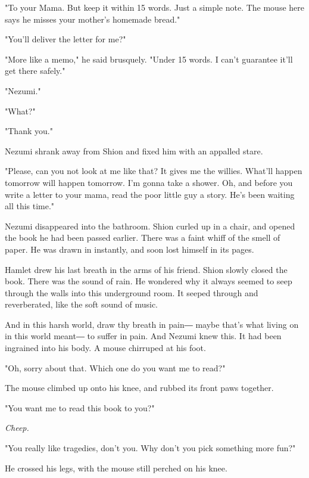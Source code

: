 "To your Mama. But keep it within 15 words. Just a simple note. The
mouse here says he misses your mother's homemade bread."

"You'll deliver the letter for me?"

"More like a memo," he said brusquely. "Under 15 words. I can't
guarantee it'll get there safely."

"Nezumi."

"What?"

"Thank you."

Nezumi shrank away from Shion and fixed him with an appalled stare.

"Please, can you not look at me like that? It gives me the willies.
What'll happen tomorrow will happen tomorrow. I'm gonna take a shower.
Oh, and before you write a letter to your mama, read the poor little guy
a story. He's been waiting all this time."

Nezumi disappeared into the bathroom. Shion curled up in a chair, and
opened the book he had been passed earlier. There was a faint whiff of
the smell of paper. He was drawn in instantly, and soon lost himself in
its pages.


Hamlet drew his last breath in the arms of his friend. Shion slowly
closed the book. There was the sound of rain. He wondered why it always
seemed to seep through the walls into this underground room. It seeped
through and reverberated, like the soft sound of music.

And in this harsh world, draw thy breath in pain― maybe that's what
living on in this world meant― to suffer in pain. And Nezumi knew this.
It had been ingrained into his body. A mouse chirruped at his foot.

"Oh, sorry about that. Which one do you want me to read?"

The mouse climbed up onto his knee, and rubbed its front paws together.

"You want me to read this book to you?"

\emph{Cheep.}

"You really like tragedies, don't you. Why don't you pick something more
fun?"

He crossed his legs, with the mouse still perched on his knee.

